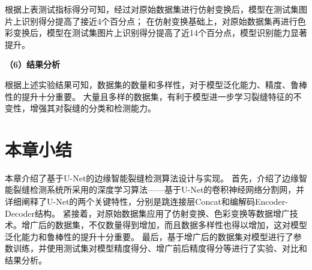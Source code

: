 根据上表测试指标得分可知，经过对原始数据集进行仿射变换后，模型在测试集图片上识别得分提高了接近4个百分点；
在仿射变换基础上，对原始数据集再进行色彩变换后，模型在测试集图片上识别得分提高了近14个百分点，模型识别能力显著提升。

\textbf{（6）结果分析}

根据上述实验结果可知，数据集的数量和多样性，对于模型泛化能力、精度、鲁棒性的提升十分重要。
大量且多样的数据集，有利于模型进一步学习裂缝特征的不变性，增强其对裂缝的分类和检测能力。


\section{本章小结}
本章介绍了基于U-Net的边缘智能裂缝检测算法设计与实现。
首先，介绍了边缘智能裂缝检测系统所采用的深度学习算法——基于U-Net的卷积神经网络分割网，并详细阐释了U-Net的两个关键特性，分别是跳连接层Concat和编解码Encoder-Decoder结构。
紧接着，对原始数据集应用了仿射变换、色彩变换等数据增广技术。增广后的数据集，不仅数量得到增加，而且数据多样性也得以增加，这对模型泛化能力和鲁棒性的提升十分重要。
最后，基于增广后的数据集对模型进行了参数训练，并使用测试集对模型精度得分、增广前后精度得分等进行了实验、对比和结果分析。